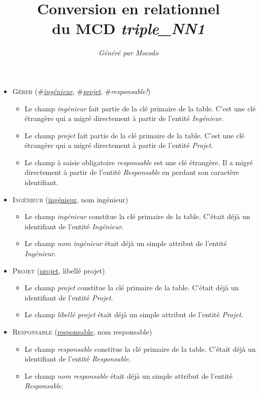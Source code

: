 \documentclass[a4paper]{article}
\title{Conversion en relationnel\\du MCD \emph{triple_NN1}}
\author{\emph{Généré par Mocodo}}
\newcommand{\relat}[1]{\textsc{#1}}
\newcommand{\attr}[1]{#1}
\newcommand{\prim}[1]{\uline{#1}}
\newcommand{\foreign}[1]{\#\textsl{#1}}
\begin{document}
\maketitle

\begin{itemize}
  \item \relat{Gérer} (\foreign{\prim{ingénieur}}, \foreign{\prim{projet}}, \foreign{responsable!})
  \begin{itemize}
    \item Le champ \emph{ingénieur} fait partie de la clé primaire de la table. C'est une clé étrangère qui a migré directement à partir de l'entité \emph{Ingénieur}.
    \item Le champ \emph{projet} fait partie de la clé primaire de la table. C'est une clé étrangère qui a migré directement à partir de l'entité \emph{Projet}.
    \item Le champ à saisie obligatoire \emph{responsable} est une clé étrangère. Il a migré directement à partir de l'entité \emph{Responsable} en perdant son caractère identifiant.
  \end{itemize}

  \item \relat{Ingénieur} (\prim{ingénieur}, \attr{nom ingénieur})
  \begin{itemize}
    \item Le champ \emph{ingénieur} constitue la clé primaire de la table. C'était déjà un identifiant de l'entité \emph{Ingénieur}.
    \item Le champ \emph{nom ingénieur} était déjà un simple attribut de l'entité \emph{Ingénieur}.
  \end{itemize}

  \item \relat{Projet} (\prim{projet}, \attr{libellé projet})
  \begin{itemize}
    \item Le champ \emph{projet} constitue la clé primaire de la table. C'était déjà un identifiant de l'entité \emph{Projet}.
    \item Le champ \emph{libellé projet} était déjà un simple attribut de l'entité \emph{Projet}.
  \end{itemize}

  \item \relat{Responsable} (\prim{responsable}, \attr{nom responsable})
  \begin{itemize}
    \item Le champ \emph{responsable} constitue la clé primaire de la table. C'était déjà un identifiant de l'entité \emph{Responsable}.
    \item Le champ \emph{nom responsable} était déjà un simple attribut de l'entité \emph{Responsable}.
  \end{itemize}

\end{itemize}
\end{document}
